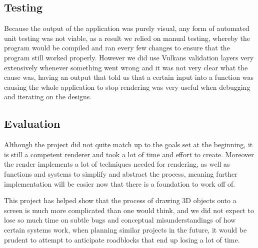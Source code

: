 \documentclass[../report.tex]{subfiles}
\begin{document}
\subsection{Testing}
Because the output of the application was purely visual, any form of automated unit testing was not viable, as a result we relied on manual testing, whereby the program would be compiled and ran every few changes to ensure that the program still worked properly.
However we did use Vulkans validation layers very extensively whenever something went wrong and it was not very clear what the cause was, having an output that told us that a certain input into a function was causing the whole application to stop rendering was very useful when debugging and iterating on the designs.

\subsection{Evaluation}
Although the project did not quite match up to the goals set at the beginning, it is still a competent renderer and took a lot of time and effort to create. Moreover the render implements a lot of techniques needed for rendering, as well as functions and systems to simplify and abstract the process, meaning further implementation will be easier now that there is a foundation to work off of.

This project has helped show that the process of drawing 3D objects onto a screen is much more complicated than one would think, and we did not expect to lose so much time on subtle bugs and conceptual misunderstandings of how certain systems work, when planning similar projects in the future, it would be prudent to attempt to anticipate roadblocks that end up losing a lot of time.
\end{document}
